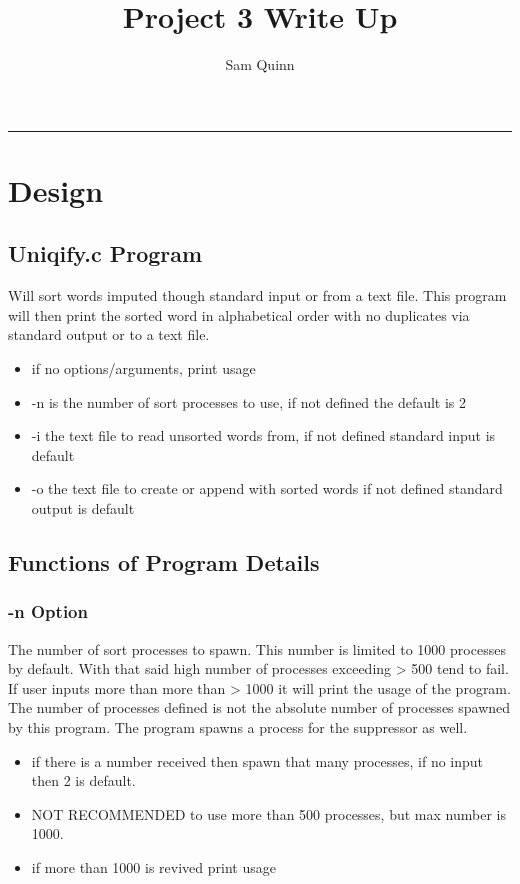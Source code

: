 \documentclass[letterpaper,10pt,notitlepage,fleqn]{article}
\title{Project 3 Write Up}
\author{Sam Quinn}
\begin{document}
\maketitle
\hrule

\section*{Design}

\subsection*{Uniqify.c Program}
Will sort words imputed though standard input or from a text file. This program will then print the sorted word
in alphabetical order with no duplicates via standard output or to a text file.

\begin{itemize} 
\item if no options/arguments, print usage
\item -n is the number of sort processes to use, if not defined the default is 2
\item -i the text file to read unsorted words from, if not defined standard input is default
\item -o the text file to create or append with sorted words if not defined standard output is default
\end{itemize}

\subsection*{Functions of Program Details}

\subsubsection*{-n Option}
The number of sort processes to spawn. This number is limited to 1000 processes by default. With that said high number
of processes exceeding > 500 tend to fail. If user inputs more than more than > 1000 it will print the usage of the
program. The number of processes defined is not the absolute number of processes spawned by this program. The
program spawns a process for the suppressor as well.
\begin{itemize}
\item if there is a number received then spawn that many processes, if no input then 2 is default.
\item NOT RECOMMENDED to use more than 500 processes, but max number is 1000.
\item if more than 1000 is revived print usage
\end{itemize}
\end{document}
